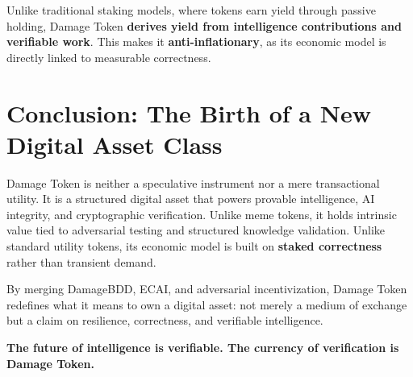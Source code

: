 \documentclass{article}
\begin{document}
Unlike traditional staking models, where tokens earn yield through passive holding, Damage Token \textbf{derives yield from intelligence contributions and verifiable work}. This makes it \textbf{anti-inflationary}, as its economic model is directly linked to measurable correctness.

\section{Conclusion: The Birth of a New Digital Asset Class}
Damage Token is neither a speculative instrument nor a mere transactional utility. It is a structured digital asset that powers provable intelligence, AI integrity, and cryptographic verification. Unlike meme tokens, it holds intrinsic value tied to adversarial testing and structured knowledge validation. Unlike standard utility tokens, its economic model is built on \textbf{staked correctness} rather than transient demand.

By merging DamageBDD, ECAI, and adversarial incentivization, Damage Token redefines what it means to own a digital asset: not merely a medium of exchange but a claim on resilience, correctness, and verifiable intelligence.

\textbf{\Huge The future of intelligence is verifiable. The currency of verification is Damage Token.} 
\end{document}
